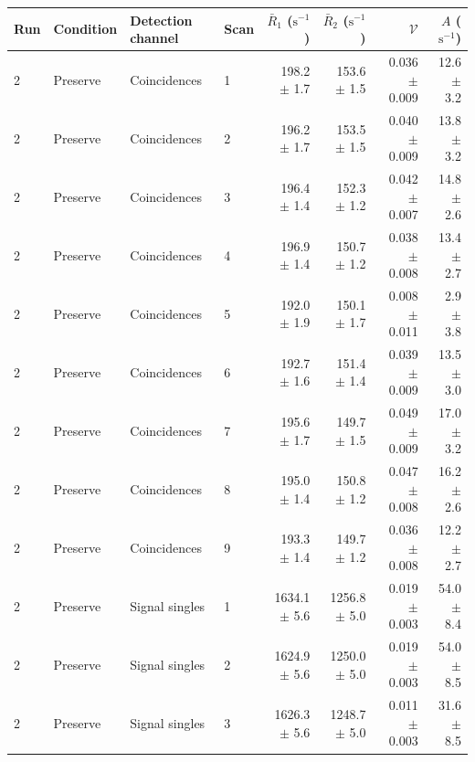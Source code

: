 \begin{tabular}{llllrrrr}
\toprule
Run & Condition & Detection channel & Scan & $\bar R_1$ ($\mathrm{s}^{-1}$) & $\bar R_2$ ($\mathrm{s}^{-1}$) & $\mathcal{V}$ & $A$ ($\mathrm{s}^{-1}$) \\
\midrule
2 & Preserve & Coincidences & 1 & 198.2 \ensuremath{\pm} 1.7 & 153.6 \ensuremath{\pm} 1.5 & 0.036 \ensuremath{\pm} 0.009 & 12.6 \ensuremath{\pm} 3.2 \\
2 & Preserve & Coincidences & 2 & 196.2 \ensuremath{\pm} 1.7 & 153.5 \ensuremath{\pm} 1.5 & 0.040 \ensuremath{\pm} 0.009 & 13.8 \ensuremath{\pm} 3.2 \\
2 & Preserve & Coincidences & 3 & 196.4 \ensuremath{\pm} 1.4 & 152.3 \ensuremath{\pm} 1.2 & 0.042 \ensuremath{\pm} 0.007 & 14.8 \ensuremath{\pm} 2.6 \\
2 & Preserve & Coincidences & 4 & 196.9 \ensuremath{\pm} 1.4 & 150.7 \ensuremath{\pm} 1.2 & 0.038 \ensuremath{\pm} 0.008 & 13.4 \ensuremath{\pm} 2.7 \\
2 & Preserve & Coincidences & 5 & 192.0 \ensuremath{\pm} 1.9 & 150.1 \ensuremath{\pm} 1.7 & 0.008 \ensuremath{\pm} 0.011 & 2.9 \ensuremath{\pm} 3.8 \\
2 & Preserve & Coincidences & 6 & 192.7 \ensuremath{\pm} 1.6 & 151.4 \ensuremath{\pm} 1.4 & 0.039 \ensuremath{\pm} 0.009 & 13.5 \ensuremath{\pm} 3.0 \\
2 & Preserve & Coincidences & 7 & 195.6 \ensuremath{\pm} 1.7 & 149.7 \ensuremath{\pm} 1.5 & 0.049 \ensuremath{\pm} 0.009 & 17.0 \ensuremath{\pm} 3.2 \\
2 & Preserve & Coincidences & 8 & 195.0 \ensuremath{\pm} 1.4 & 150.8 \ensuremath{\pm} 1.2 & 0.047 \ensuremath{\pm} 0.008 & 16.2 \ensuremath{\pm} 2.6 \\
2 & Preserve & Coincidences & 9 & 193.3 \ensuremath{\pm} 1.4 & 149.7 \ensuremath{\pm} 1.2 & 0.036 \ensuremath{\pm} 0.008 & 12.2 \ensuremath{\pm} 2.7 \\
\midrule
2 & Preserve & Signal singles & 1 & 1634.1 \ensuremath{\pm} 5.6 & 1256.8 \ensuremath{\pm} 5.0 & 0.019 \ensuremath{\pm} 0.003 & 54.0 \ensuremath{\pm} 8.4 \\
2 & Preserve & Signal singles & 2 & 1624.9 \ensuremath{\pm} 5.6 & 1250.0 \ensuremath{\pm} 5.0 & 0.019 \ensuremath{\pm} 0.003 & 54.0 \ensuremath{\pm} 8.5 \\
2 & Preserve & Signal singles & 3 & 1626.3 \ensuremath{\pm} 5.6 & 1248.7 \ensuremath{\pm} 5.0 & 0.011 \ensuremath{\pm} 0.003 & 31.6 \ensuremath{\pm} 8.5 \\

\end{tabular}

